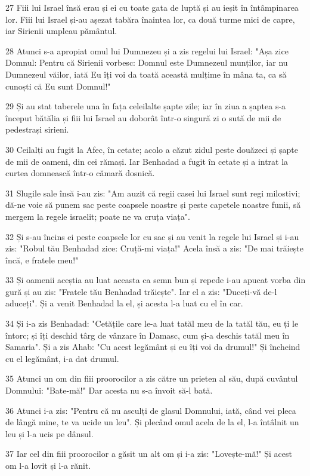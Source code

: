 \par 27 Fiii lui Israel însă erau și ei cu toate gata de luptă și au ieșit în întâmpinarea lor. Fiii lui Israel și-au așezat tabăra înaintea lor, ca două turme mici de capre, iar Sirienii umpleau pământul.
\par 28 Atunci s-a apropiat omul lui Dumnezeu și a zis regelui lui Israel: "Așa zice Domnul: Pentru că Sirienii vorbesc: Domnul este Dumnezeul munților, iar nu Dumnezeul văilor, iată Eu îți voi da toată această mulțime în mâna ta, ca să cunoști că Eu sunt Domnul!"
\par 29 Și au stat taberele una în fața celeilalte șapte zile; iar în ziua a șaptea s-a început bătălia și fiii lui Israel au doborât într-o singură zi o sută de mii de pedestrași sirieni.
\par 30 Ceilalți au fugit la Afec, în cetate; acolo a căzut zidul peste douăzeci și șapte de mii de oameni, din cei rămași. Iar Benhadad a fugit în cetate și a intrat la curtea domnească într-o cămară dosnică.
\par 31 Slugile sale însă i-au zis: "Am auzit că regii casei lui Israel sunt regi milostivi; dă-ne voie să punem sac peste coapsele noastre și peste capetele noastre funii, să mergem la regele israelit; poate ne va cruța viața".
\par 32 Și s-au încins ei peste coapsele lor cu sac și au venit la regele lui Israel și i-au zis: "Robul tău Benhadad zice: Cruță-mi viața!" Acela însă a zis: "De mai trăiește încă, e fratele meu!"
\par 33 Și oamenii aceștia au luat aceasta ca semn bun și repede i-au apucat vorba din gură și au zis: "Fratele tău Benhadad trăiește". Iar el a zis: "Duceți-vă de-l aduceți". Și a venit Benhadad la el, și acesta l-a luat cu el în car.
\par 34 Și i-a zis Benhadad: "Cetățile care le-a luat tatăl meu de la tatăl tău, eu ți le întorc; și îți deschid târg de vânzare în Damasc, cum și-a deschis tatăl meu în Samaria". Și a zis Ahab: "Cu acest legământ și eu îți voi da drumul!" Și încheind cu el legământ, i-a dat drumul.
\par 35 Atunci un om din fiii proorocilor a zis către un prieten al său, după cuvântul Domnului: "Bate-mă!" Dar acesta nu s-a învoit să-l bată.
\par 36 Atunci i-a zis: "Pentru că nu asculți de glasul Domnului, iată, când vei pleca de lângă mine, te va ucide un leu". Și plecând omul acela de la el, l-a întâlnit un leu și l-a ucis pe dânsul.
\par 37 Iar cel din fiii proorocilor a găsit un alt om și i-a zis: "Lovește-mă!" Și acest om l-a lovit și l-a rănit.
